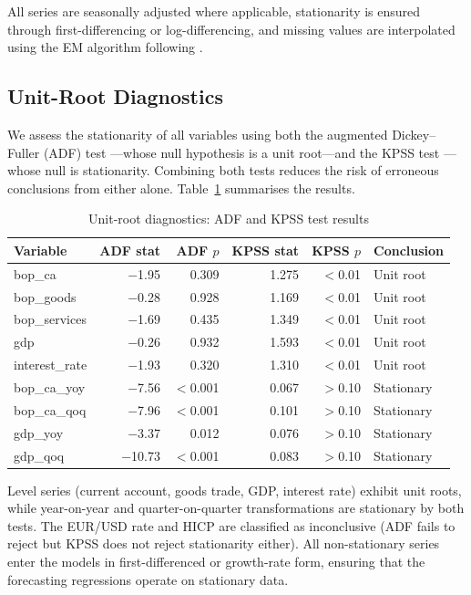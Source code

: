 All series are seasonally adjusted where applicable, stationarity is ensured through first-differencing or log-differencing, and missing values are interpolated using the EM algorithm following \citet{stock2002macroeconomic}.

\subsection{Unit-Root Diagnostics}

We assess the stationarity of all variables using both the augmented Dickey--Fuller (ADF) test \citep{dickey1979distribution}---whose null hypothesis is a unit root---and the KPSS test \citep{kwiatkowski1992testing}---whose null is stationarity.  Combining both tests reduces the risk of erroneous conclusions from either alone.  Table~\ref{tab:ch1_unitroot} summarises the results.

\begin{table}[htbp]
\centering
\caption{Unit-root diagnostics: ADF and KPSS test results}
\label{tab:ch1_unitroot}
\begin{tabular}{@{} l rr rr l @{}}
\toprule
{Variable} & {ADF stat} & {ADF $p$} & {KPSS stat} & {KPSS $p$} & {Conclusion} \\
\midrule
bop\_ca       & $-$1.95 & 0.309 & 1.275 & $<$0.01 & Unit root \\
bop\_goods    & $-$0.28 & 0.928 & 1.169 & $<$0.01 & Unit root \\
bop\_services & $-$1.69 & 0.435 & 1.349 & $<$0.01 & Unit root \\
gdp           & $-$0.26 & 0.932 & 1.593 & $<$0.01 & Unit root \\
interest\_rate& $-$1.93 & 0.320 & 1.310 & $<$0.01 & Unit root \\
bop\_ca\_yoy  & $-$7.56 & $<$0.001 & 0.067 & $>$0.10 & Stationary \\
bop\_ca\_qoq  & $-$7.96 & $<$0.001 & 0.101 & $>$0.10 & Stationary \\
gdp\_yoy      & $-$3.37 & 0.012 & 0.076 & $>$0.10 & Stationary \\
gdp\_qoq      & $-$10.73 & $<$0.001 & 0.083 & $>$0.10 & Stationary \\
\bottomrule
\end{tabular}
\end{table}

Level series (current account, goods trade, GDP, interest rate) exhibit unit roots, while year-on-year and quarter-on-quarter transformations are stationary by both tests.  The EUR/USD rate and HICP are classified as inconclusive (ADF fails to reject but KPSS does not reject stationarity either).  All non-stationary series enter the models in first-differenced or growth-rate form, ensuring that the forecasting regressions operate on stationary data.


